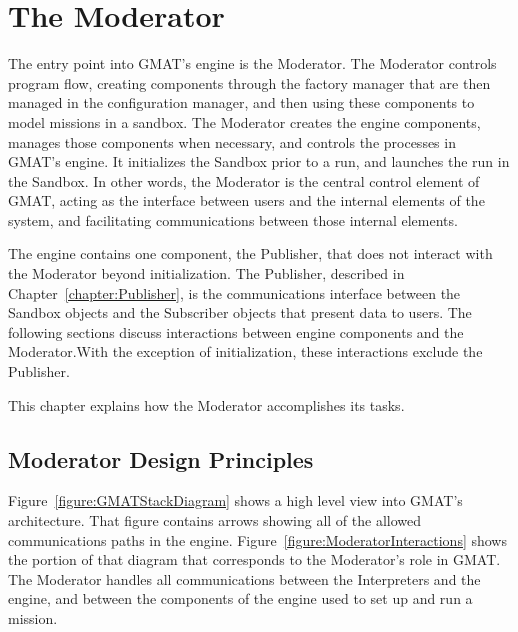\chapter{\label{chapter:Moderator}The Moderator}

The entry point into GMAT's engine is the Moderator.  The Moderator controls program flow, creating
components through the factory manager that are then managed in the configuration manager, and
then using these components to model missions in a sandbox.  The Moderator creates the engine
components, manages those components when necessary, and controls the processes in GMAT's engine. 
It initializes the Sandbox prior to a run, and launches the run in the Sandbox.  In other words, the
Moderator is the central control element of GMAT, acting as the interface between users and the
internal elements of the system, and facilitating communications between those internal elements.

The engine contains one component, the Publisher, that does not interact with the Moderator beyond
initialization.  The Publisher, described in Chapter~\ref{chapter:Publisher}, is the communications
interface between the Sandbox objects and the Subscriber objects that present data to users.  The
following sections discuss interactions between engine components and the Moderator.With the
exception of initialization, these interactions exclude the Publisher.

This chapter explains how the Moderator accomplishes its tasks.

\section{Moderator Design Principles}

Figure~\ref{figure:GMATStackDiagram} shows a high level view into GMAT's architecture.  That figure
contains arrows showing all of the allowed communications paths in the engine.
Figure~\ref{figure:ModeratorInteractions} shows the portion of that diagram that corresponds to the
Moderator's role in GMAT.  The Moderator handles all communications between the Interpreters and
the engine, and between the components of the engine used to set up and run a mission.

